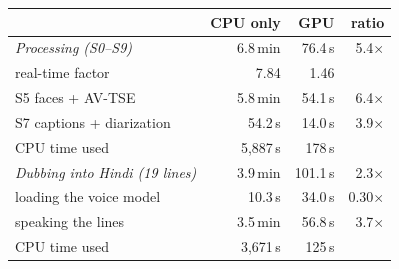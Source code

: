 \begin{tabular}{@{}lrrr@{}}
\toprule
 & CPU only & GPU & ratio \\
\midrule
\textit{Processing (S0--S9)} & 6.8\,min & 76.4\,s & 5.4$\times$ \\
\quad real-time factor & 7.84 & 1.46 &  \\
\quad S5 faces + AV-TSE & 5.8\,min & 54.1\,s & 6.4$\times$ \\
\quad S7 captions + diarization & 54.2\,s & 14.0\,s & 3.9$\times$ \\
\quad CPU time used & 5,887\,s & 178\,s &  \\
\midrule
\textit{Dubbing into Hindi (19 lines)} & 3.9\,min & 101.1\,s & 2.3$\times$ \\
\quad loading the voice model & 10.3\,s & 34.0\,s & 0.30$\times$ \\
\quad speaking the lines & 3.5\,min & 56.8\,s & 3.7$\times$ \\
\quad CPU time used & 3,671\,s & 125\,s &  \\
\bottomrule
\end{tabular}
